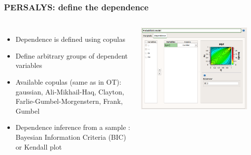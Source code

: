 \documentclass{beamer}
\begin{document}


\begin{frame}
\frametitle{PERSALYS: define the dependence}
	

  \begin{columns}
	
\begin{itemize}
\item Dependence is defined using copulas
\item Define arbitrary groups of dependent variables
\item Available copulas (same as in OT): gaussian, Ali-Mikhail-Haq, 
    Clayton, Farlie-Gumbel-Morgenstern, Frank, Gumbel
\item Dependence inference from a sample : Bayesian Information Criteria (BIC) 
or Kendall plot
\end{itemize}


\begin{center}
\includegraphics[width=0.95\textwidth]{figures/persalys-dependence-extract.png}
\end{center}

	\end{columns}

\end{frame}

\end{document}
